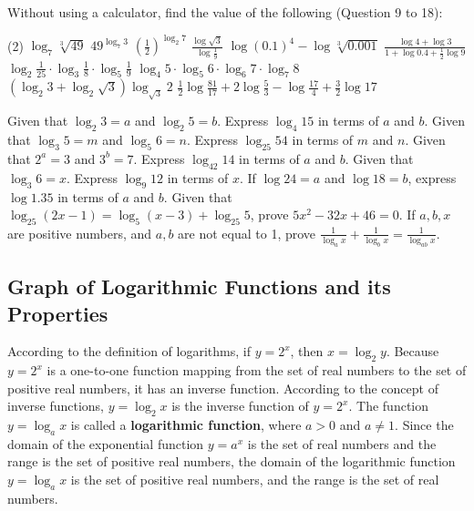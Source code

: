 \documentclass{report}
\begin{document}
        \noindent Without using a calculator, find the value of the following (Question 9 to 18):
        \begin{tasks}[label=\arabic*., start=9](2)
            \task $\displaystyle\log _7 \sqrt[3]{49}$
            \task $\displaystyle49^{\log _7 3}$
            \task $\displaystyle\left(\frac{1}{2}\right)^{\log _2 7}$
            \task $\displaystyle\frac{\log \sqrt{3}}{\log \frac{1}{9}}$
            \task $\displaystyle\log (0.1)^4-\log \sqrt[3]{0.001}$
            \task $\displaystyle\frac{\log 4+\log 3}{1+\log 0.4+\frac{1}{2} \log 9}$
            \task $\displaystyle\log _2 \frac{1}{25} \cdot \log _3 \frac{1}{8} \cdot \log _5 \frac{1}{9}$
            \task $\displaystyle\log _4 5 \cdot \log _5 6 \cdot \log _6 7 \cdot \log _7 8$
            \task $\displaystyle\left(\log _2 3+\log _2 \sqrt{3}\right) \log _{\sqrt{3}} 2$
            \task $\displaystyle\frac{1}{2} \log \frac{81}{17}+2 \log \frac{5}{3}-\log \frac{17}{4}+\frac{3}{2} \log 17$
        \end{tasks}
        \begin{tasks}[label=\arabic*, resume]
            \task Given that $\log _2 3=a$ and $\log _2 5=b$. Express $\log _4 15$ in terms of $a$ and $b$.
            \task Given that $\log _3 5=m$ and $\log _5 6=n$. Express $\log _{25} 54$ in terms of $m$ and $n$.
            \task Given that $2^a=3$ and $3^b=7$. Express $\log _{42} 14$ in terms of $a$ and $b$.
            \task Given that $\log _3 6=x$. Express $\log _9 12$ in terms of $x$.
            \task If $\log 24=a$ and $\log 18=b$, express $\log 1.35$ in terms of $a$ and $b$.
            \task Given that $\log _{25}(2 x-1)=\log _5(x-3)+\log _{25} 5$, prove $5 x^2-32 x+46=0$.
            \task If $a, b, x$ are positive numbers, and $a, b$ are not equal to 1, prove $\displaystyle\frac{1}{\log _a x}+\frac{1}{\log _b x}=\frac{1}{\log _{a b} x}$.
        \end{tasks}

        \subsection*{Graph of Logarithmic Functions and its Properties}

        According to the definition of logarithms, if $y=2^x$, then $x=\log _2 y$. Because $y=2^x$ is a one-to-one function mapping from the set of real numbers to the set of positive real numbers, it has an inverse function. According to the concept of inverse functions, $y=\log _2 x$ is the inverse function of $y=2^x$. The function $y=\log _a x$ is called a \textbf{logarithmic function}, where $a>0$ and $a \neq 1$. Since the domain of the exponential function $y=a^x$ is the set of real numbers and the range is the set of positive real numbers, the domain of the logarithmic function $y=\log _a x$ is the set of positive real numbers, and the range is the set of real numbers.
\end{document}
